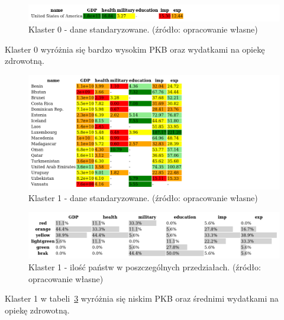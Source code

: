 \documentclass[11pt]{report}
\begin{document}
    \begin{figure}[!htp]
        \centering
        \includegraphics[width=1 \textwidth]{tables/CLUST/cluster0stdkmeans.png}
        \caption{Klaster 0 - dane standaryzowane. (źródło: opracowanie własne)}
        \label{tab:cl0std}
    \end{figure}
    Klaster 0 wyróżnia się bardzo wysokim PKB oraz wydatkami na opiekę zdrowotną.

    

    \begin{figure}[!htp]
        \centering
        \includegraphics[width=1 \textwidth]{tables/CLUST/cluster1stdkmeans.png}
        \caption{Klaster 1 - dane standaryzowane. (źródło: opracowanie własne)}
        \label{tab:cl1std}
    \end{figure}

    \begin{figure}[!htp]
        \centering
        \includegraphics[width=1 \textwidth]{tables/CLUST/cluster1stdkmeanscount.png}
        \caption{Klaster 1 - ilość państw w poszczególnych przedziałach. (źródło: opracowanie własne)}
        \label{tab:cl1stdcount}
    \end{figure}

    Klaster 1 w tabeli~\ref{tab:cl1stdcount} wyróżnia się niskim PKB oraz średnimi wydatkami na opiekę zdrowotną.

    
\end{document}
